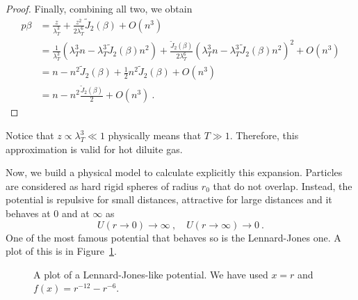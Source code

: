 \begin{proof}
        Finally, combining all two, we obtain 
        \begin{equation*}
        \begin{aligned}
            p \beta & = \frac{z}{\lambda_T^3} + \frac{z^2}{2 \lambda_T^6} \tilde J_2 (\beta) + O(n^3) \\ & = \frac{1}{\lambda_T^3} (\lambda_T^3 n - \lambda^3_T \tilde J_2(\beta) n^2) + \frac{\tilde J_2 (\beta)}{2 \lambda_T^6} ( \lambda_T^3 n - \lambda^3_T \tilde J_2(\beta) n^2)^2 + O(n^3) \\ & = n - n^2 \tilde J_2 (\beta) + \frac{1}{2} n^2 \tilde J_2 (\beta) + O(n^3) \\ & = n - n^2 \frac{\tilde J_2(\beta)}{2} + O(n^3) ~.
        \end{aligned}
        \end{equation*}
    \end{proof}
    Notice that $z \propto \lambda^3_T \ll 1$ physically means that $T \gg 1$. Therefore, this approximation is valid for hot diluite gas.

    Now, we build a physical model to calculate explicitly this expansion. Particles are considered as hard rigid spheres of radius $r_0$ that do not overlap. Instead, the potential is repulsive for small distances, attractive for large distances and it behaves at $0$ and at $\infty$ as
    \begin{equation*}
        U(r \rightarrow 0) \rightarrow \infty ~, \quad U(r \rightarrow \infty) \rightarrow 0~.
    \end{equation*}
    One of the most famous potential that behaves so is the Lennard-Jones one. A plot of this is in Figure~\ref{gran:lj}.
    \begin{figure}
        \centering
        \caption{A plot of a Lennard-Jones-like potential. We have used $x = r$ and $f(x) = r^{-12} - r^{-6}$.}
        \label{gran:lj}
    \end{figure}

